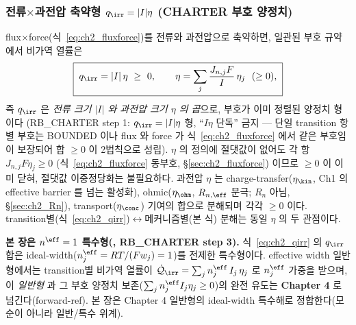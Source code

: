 \subsubsection{전류$\times$과전압 축약형 $q_\irr=|I|\eta$ (CHARTER 부호 양정치)}\label{sec:ch2_Ieta}
flux$\times$force(식~\eqref{eq:ch2_fluxforce})를 전류와 과전압으로 축약하면, 일관된 부호 규약에서 비가역 열률은
\begin{equation}
\boxed{\;q_{\irr}=|I|\,\eta\ \ge\ 0,\qquad \eta=\sum_j \frac{J_{n,j}F}{I}\,\eta_j\ \ (\ge0),\;}
\label{eq:ch2_qirr}
\end{equation}
즉 $q_\irr$ 은 \emph{전류 크기 $|I|$ 와 과전압 크기 $\eta$ 의 곱}으로, 부호가 이미 정렬된 양정치 형이다
(RB\_CHARTER step 1: $q_\irr=|I|\eta$ 형, ``$I\eta$ 단독'' 금지 — 단일 transition 항별 부호는 BOUNDED 이나
flux 와 force 가 식~\eqref{eq:ch2_fluxforce} 에서 같은 부호임이 보장되어 합 $\ge0$ 이 2법칙으로 성립). $\eta$ 의
정의에 절댓값이 없어도 각 항 $J_{n,j}F\eta_j\ge0$ (식~\eqref{eq:ch2_fluxforce} 동부호, \S\ref{sec:ch2_fluxforce})
이므로 $\ge0$ 이 이미 닫혀, 절댓값 이중정당화는 불필요하다. 과전압
$\eta$ 는 charge-transfer($\eta_\kin$, Ch1 의 effective barrier 를 넘는 활성화), ohmic($\eta_\ohm$,
$R_{n,\eff}$ 분극; $R_n$ 아님, \S\ref{sec:ch2_Rn}), transport($\eta_\conc$) 기여의 합으로 분해되며 각각 $\ge0$ 이다.
transition별(식~\eqref{eq:ch2_qirr})$\leftrightarrow$메커니즘별(본 식) 분해는 동일 $\eta$ 의 두 관점이다.
\begin{boundbox}
\textbf{본 장은 $n^{\eff}=1$ 특수형(, RB\_CHARTER step 3).} 식~\eqref{eq:ch2_qirr} 의 $q_\irr$ 합은
ideal-width($n_j^{\eff}=RT/(Fw_j)=1$)를 전제한 특수형이다. effective width 일반형에서는 transition별 비가역
열률이 $\dot{\mathcal Q}_{\irr}=\sum_j n_j^{\eff}\,I_j\,\eta_j$ 로 $n_j^{\eff}$ 가중을 받으며, 이 \emph{일반형}
과 그 부호 양정치 보존($\sum_j n_j^{\eff}I_j\eta_j\ge0$)의 완전 유도는 \textbf{Chapter 4} 로 넘긴다(forward-ref).
본 장은 Chapter 4 일반형의 ideal-width 특수해로 정합한다(모순이 아니라 일반/특수 위계).
\end{boundbox}

